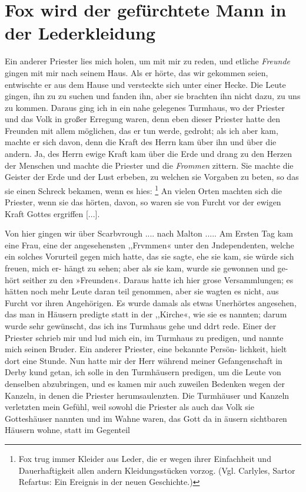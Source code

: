 \section{Fox wird der gefürchtete Mann in der Lederkleidung}

Ein anderer Priester lies mich holen, um mit mir zu reden,
und etliche \textit{Freunde} gingen mit mir nach seinem Haus. Als
er hörte, das wir gekommen seien, entwischte er aus dem Hause
und versteckte sich unter einer Hecke. Die Leute gingen, ihn zu
zu suchen und fanden ihn, aber sie brachten ihn nicht dazu, zu
uns zu kommen. Daraus ging ich in ein nahe gelegenes Turmhaus, 
wo der Priester und das Volk in großer Erregung waren,
denn eben dieser Priester hatte den Freunden mit allem möglichen,
das er tun werde, gedroht; als ich aber kam, machte er sich davon,
denn die Kraft des Herrn kam über ihn und über die andern.
Ja, des Herrn ewige Kraft kam über die Erde und drang zu
den Herzen der Menschen und machte die Priester und die
\textit{Frommen} zittern. Sie machte die 
Geister der Erde und der
Lust erbeben, zu welchen sie Vorgaben zu beten, so das sie einen
Schreck bekamen, wenn es hies: \footnote{Fox trug 
immer Kleider aus Leder, die er wegen ihrer Einfachheit und
Dauerhaftigkeit allen andern Kleidungsstücken vorzog. 
(Vgl. Carlyles, Sartor Refartus: Ein Ereignis in der 
neuen Geschichte.)} An vielen Orten machten sich die Priester,
wenn sie das hörten, davon, so waren sie von Furcht vor der
ewigen Kraft Gottes ergriffen [...].


Von hier gingen wir über Scarbvrough .... nach Malton .....
Am Ersten Tag kam eine Frau, eine der angesehensten ,,Frvmmen«
unter den Jndependenten, welche ein solches Vorurteil gegen mich
hatte, das sie sagte, ehe sie kam, sie würde sich freuen, mich er-
hängt zu sehen; aber als sie kam, wurde sie gewonnen und ge-
hört seither zu den »Freunden«.
Daraus hatte ich hier grose Versammlungen; es hätten noch
mehr Leute daran teil genommen, aber sie wagten es nicht, aus
Furcht vor ihren Angehörigen. Es wurde damals als etwas
Unerhörtes angesehen, das man in Häusern predigte statt in der
,,Kirche«, wie sie es nannten; darum wurde sehr gewünscht, das
ich ins Turmhaus gehe und ddrt rede. Einer der Priester schrieb
mir und lud mich ein, im Turmhaus zu predigen, und nannte
mich seinen Bruder. Ein anderer Priester, eine bekannte Persön-
lichkeit, hielt dort eine Stunde. Nun hatte mir der Herr während
meiner Gefangenschaft in Derby kund getan, ich solle in den
Turmhäusern predigen, um die Leute von denselben abzubringen,
und es kamen mir auch zuweilen Bedenken wegen der Kanzeln,
in denen die Priester herumsaulenzten. Die Turmhäuser und
Kanzeln verletzten mein Gefühl, weil sowohl die Priester als auch
das Volk sie Gotteshäuser nannten und im Wahne waren, das
Gott da in äusern sichtbaren Häusern wohne, statt im Gegenteil



